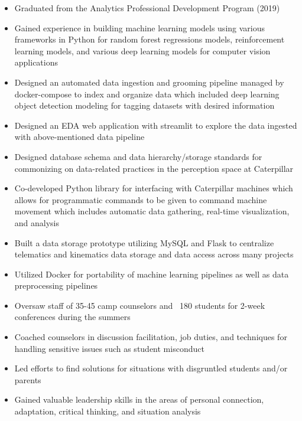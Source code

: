 \documentclass[10pt,a4paper]{altacv}
\begin{document}
\begin{itemize}
\item Graduated from the Analytics Professional Development Program (2019)
\item Gained experience in building machine learning models using various frameworks in Python for random forest regressions models, reinforcement learning models, and various deep learning models for computer vision applications
\item Designed an automated data ingestion and grooming pipeline managed by docker-compose to index and organize data which included deep learning object detection modeling for tagging datasets with desired information
\item Designed an EDA web application with streamlit to explore the data ingested with above-mentioned data pipeline
\item Designed database schema and data hierarchy/storage standards for commonizing on data-related practices in the perception space at Caterpillar
\item Co-developed Python library for interfacing with Caterpillar machines which allows for programmatic commands to be given to command machine movement which includes automatic data gathering, real-time visualization, and analysis
\item Built a data storage prototype utilizing MySQL and Flask to centralize telematics and kinematics data storage and data access across many projects
\item Utilized Docker for portability of machine learning pipelines as well as data preprocessing pipelines

\end{itemize}

\begin{itemize}
\item Oversaw staff of 35-45 camp counselors and ~180 students for 2-week conferences during the summers
\item Coached counselors in discussion facilitation, job duties, and techniques for handling sensitive issues such as student misconduct
\item Led efforts to find solutions for situations with disgruntled students and/or parents
\item Gained valuable leadership skills in the areas of personal connection, adaptation, critical thinking, and situation analysis

\end{itemize}
\end{document}
